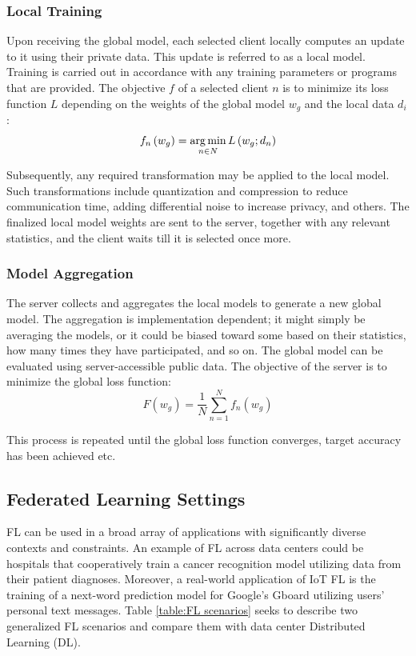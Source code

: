 \subsubsection{Local Training} %
Upon receiving the global model, each selected client locally computes an update to it using their private data. This update is referred to as a local model. Training is carried out in accordance with any training parameters or programs that are provided. The objective \(f\) of a selected client \(n\) is to minimize its loss function \(L\) depending on the weights of the global model \(w_g\) and the local data \(d_i\):
\begin{equation}
    f_n \left( w_g \right) = \operatorname*{arg\,min}_{n\in N} L\left( w_g ; d_n \right)
	\label{eqn:FL, Objective of a selected client}
\end{equation}

Subsequently, any required transformation may be applied to the local model. Such transformations include quantization and compression to reduce communication time, adding differential noise to increase privacy, and others. The finalized local model weights are sent to the server, together with any relevant statistics, and the client waits till it is selected once more.

\subsubsection{Model Aggregation} %
The server collects and aggregates the local models to generate a new global model. The aggregation is implementation dependent; it might simply be averaging the models, or it could be biased toward some based on their statistics, how many times they have participated, and so on. The global model can be evaluated using server-accessible public data. The objective of the server is to minimize the global loss function:
\begin{equation}
    F \left( w_g \right) = \frac{1}{N} \sum_{n=1}^N f_n \left( w_g \right)
	\label{eqn:FL, Objective of the server}
\end{equation}

This process is repeated until the global loss function converges, target accuracy has been achieved etc.

\subsection{Federated Learning Settings} %
FL can be used in a broad array of applications with significantly diverse contexts and constraints. An example of FL across data centers could be hospitals that cooperatively train a cancer recognition model utilizing data from their patient diagnoses. Moreover, a real-world application of IoT FL is the training of a next-word prediction model for Google's Gboard \cite{GBoard_FL} utilizing users' personal text messages. Table \ref{table:FL scenarios} seeks to describe two generalized FL scenarios and compare them with data center Distributed Learning (DL).


